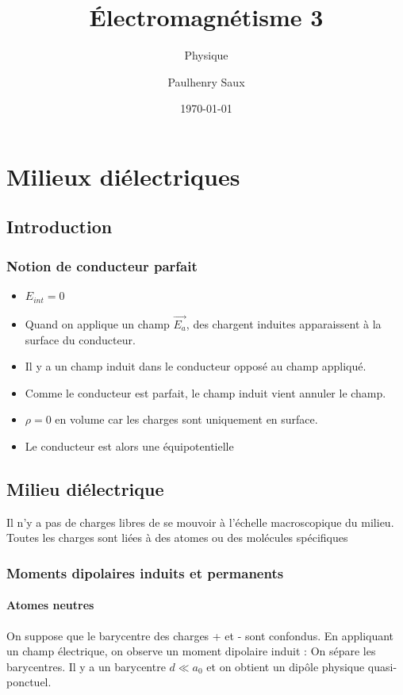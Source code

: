 \documentclass[french]{yLectureNote}
\title{Électromagnétisme 3}
\subtitle{Physique}
\author{Paulhenry Saux}
\date{\today}
\renewcommand{\vec}{\overrightarrow}
\begin{document}
\setcounter{chapter}{1}

\chapter{Milieux diélectriques}
\section{Introduction}\subsection{Notion de conducteur parfait}
\begin{proposition}
    \begin{itemize}
        \item $E_{int} = 0$
        \item Quand on applique un champ $\vec{E_a}$, des chargent induites apparaissent à la surface du conducteur.
        \item Il y a un champ induit dans le conducteur opposé au champ appliqué.
        \item Comme le conducteur est parfait, le champ induit vient annuler le champ.
        \item $\rho = 0$ en volume car les charges sont uniquement en surface.
        \item Le conducteur est alors une équipotentielle
    \end{itemize}
\end{proposition}
\section{Milieu diélectrique}
\begin{definition}
    Il n'y a pas de charges libres de se mouvoir à l'échelle macroscopique du milieu. Toutes les charges sont liées à des atomes ou des molécules spécifiques
\end{definition}
\subsection{Moments dipolaires induits et permanents}
\subsubsection{Atomes neutres}
On suppose que le barycentre des charges + et - sont confondus. En appliquant un champ électrique, on observe un moment dipolaire induit : On sépare les barycentres. Il y a un barycentre $d\ll a_0$ et on obtient un dipôle physique quasi-ponctuel.
 
\end{document}
